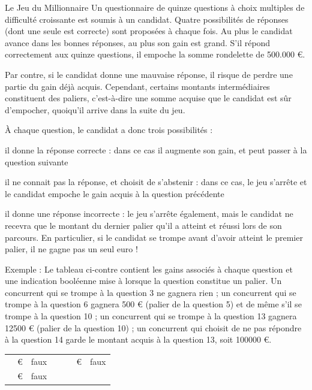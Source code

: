 \begin{Exercice}{Le Jeu du Millionnaire}
	Un questionnaire de quinze questions à choix
	multiples de difficulté croissante est soumis à un candidat. Quatre
	possibilités de réponses (dont une seule est correcte) sont proposées à
	chaque fois. Au plus le candidat avance dans les bonnes réponses, au
	plus son gain est grand. S’il répond correctement aux quinze questions,
	il empoche la somme rondelette de 500.000 €.
	
	Par contre, si le candidat donne une mauvaise
	réponse, il risque de perdre une partie du gain déjà acquis. Cependant,
	certains montants intermédiaires constituent des paliers, c’est-à-dire
	une somme acquise que le candidat est sûr d’empocher, quoiqu’il arrive
	dans la suite du jeu.

À chaque question, le candidat a donc trois
	possibilités :

	\begin{liste}
		\item 
			il donne la réponse correcte : dans ce cas il
			augmente son gain, et peut passer à la question suivante
		\item 
			il ne connait pas la réponse, et choisit de
			s’abstenir : dans ce cas, le jeu s’arrête et le candidat empoche le
			gain acquis à la question précédente
		\item 
			il donne une réponse incorrecte : le jeu
			s’arrête également, mais le candidat ne recevra que le montant du
			dernier palier qu’il a atteint et réussi lors de son parcours. En
			particulier, si le candidat se trompe avant d’avoir atteint le premier
			palier, il ne gagne pas un seul euro !
	\end{liste}
	
	Exemple : Le tableau ci-contre contient les gains associés à chaque 
	question et une indication booléenne mise à
	 lorsque la question
	constitue un palier. Un concurrent qui se
	trompe à la question 3 ne gagnera rien ; un concurrent qui se trompe à
	la question 6 gagnera 500 € (palier de la question 5) et de même s’il
	se trompe à la question 10 ; un concurrent qui se trompe à la question
	13 gagnera 12500 € (palier de la question 10) ; un concurrent qui
	choisit de ne pas répondre à la question 14 garde le montant acquis à
	la question 13, soit 100000 €.

	\begin{center}
	\begin{minipage}{7.041cm}
	\begin{flushleft}
	\tablehead{}
	\begin{supertabular}{|m{0.27600002cm}|m{1.1509999cm}|m{0.774cm}|m{0.12300001cm}|m{0.472cm}|m{1.6359999cm}|m{0.774cm}|}
	\hhline{---~---}
	 &
	 € &
	 faux &
	~
	 &
	 &
	 € &
	 faux\\\hhline{---~---}
	 &
	 € &
	 faux &
	~
	 &
	 &
	\raggedleft  {} &


\end{supertabular}
\end{flushleft}
\end{minipage}
\end{center}
\end{Exercice}
